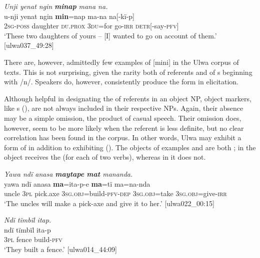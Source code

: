 \ea%
    \label{ex:det:47}
          \textit{Unji yenat ngin} \textbf{\textit{minap}} \textit{mana na.}\\
\gll    u-nji    yenat    ngin    \textbf{min}=nap  ma-na  na[-kï-p]\\
    2\textsc{sg-poss}  daughter  \textsc{du.prox}  \textsc{3du=}for  go-\textsc{irr}  \textsc{detr[}{}-say-\textsc{pfv]}\\
\glt `These two daughters of yours -- [I] wanted to go on account of them.’ [ulwa037\_49:28]
\z

There are, however, admittedly few examples of [mini] in the Ulwa corpus of texts. This is not surprising, given the rarity both of  referents and of s beginning with /n/. Speakers do, however, consistently produce the form in elicitation.

  Although helpful in designating the  of referents in an object NP, object markers, like s (), are not always included in their respective NPs. Again, their absence may be a simple omission, the product of casual speech. Their omission does, however, seem to be more likely when the referent is less definite, but no clear correlation has been found in the corpus. In other words, Ulwa may exhibit a form of   in addition to exhibiting  (). The objects of examples  and  are both ; in  the object receives the  (for each of two verbs), whereas in  it does not.

\ea%
    \label{ex:det:48}
\textit{Yawa ndï anasa \textbf{maytape} \textbf{mat} mananda.}\\
\gll    yawa  ndï  anasa    \textbf{ma}=ita-p-e        \textbf{ma}=tï ma=na-nda\\
    uncle  3\textsc{pl}  pick.axe  3\textsc{sg.obj}=build-\textsc{pfv-dep}  3\textsc{sg.obj}=take    3\textsc{sg.obj}=give-\textsc{irr}\\
\glt `The uncles will make a pick-axe and give it to her.’ [ulwa022\_00:15]
\z

\ea%
    \label{ex:det:49}
          \textit{Ndï tïmbïl itap.}\\
\gll    ndï  tïmbïl  ita-p\\
    3\textsc{pl}  fence  build-\textsc{pfv}\\
\glt `They built a fence.’ [ulwa014\_44:09]
\z

